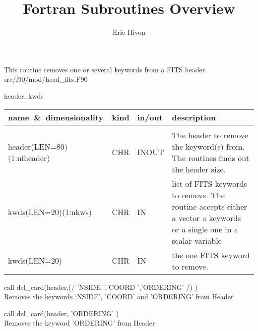 
\sloppy

\title{\healpix Fortran Subroutines Overview}
 \section[del\_card]{ }
\label{sub:del_card}
\author{Eric Hivon}

\begin{facility}
{This routine removes one or several keywords from a FITS header.}
{src/f90/mod/head\_fits.F90}
\end{facility}

\begin{f90format}
{header, kwds}
\end{f90format}

\begin{arguments}
{
\begin{tabular}{p{0.4\hsize} p{0.05\hsize} p{0.1\hsize} p{0.35\hsize}} \hline  
\textbf{name~\&~dimensionality} & \textbf{kind} & \textbf{in/out} & \textbf{description} \\ \hline
                   &   &   &                           \\ %
header(LEN=80)(1:nlheader) & CHR & INOUT & The header to remove the keyword(s)
                   from. The routines finds out the header size.\\
kwds(LEN=20)(1:nkws) & CHR & IN & list of FITS keywords to
                   remove. The routine accepts either a vector a keywords or a
                   single one in a scalar variable\\
kwds(LEN=20)  & CHR & IN & the one FITS keyword to
                   remove.\\
\end{tabular}
}
\end{arguments}

\begin{examples}{1}
{
call del\_card(header,(/ 'NSIDE   ','COORD   ','ORDERING' /) ) \\
}
{
Removes the keywords `NSIDE', 'COORD' and 'ORDERING' from Header
}
\end{examples}

\begin{examples}{2}
{
call del\_card(header, 'ORDERING' ) \\
}
{
Removes the keyword 'ORDERING' from Header
}
\end{examples}

